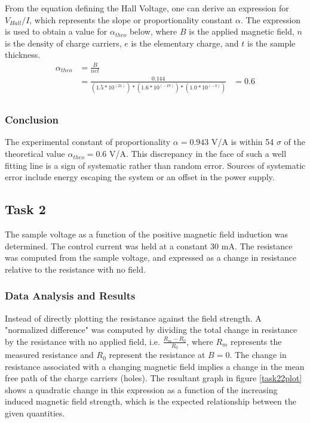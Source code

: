 \documentclass[a4paper]{article}
\begin{document}
\qq From the equation defining the Hall Voltage, one can derive an
expression for $V_{Hall}/I$, which represents the slope or
proportionality constant $\alpha$. The expression is used to obtain a
value for $\alpha_{theo}$ below, where $B$ is the applied magnetic
field, $n$ is the density of charge carriers, $e$ is the elementary
charge, and $t$ is the sample thickness.
\begin{align*}
\alpha_{theo} &= \frac{B}{net} \\
              &= \frac{0.144}{(1.5 * 10^(21))*(1.6 * 10^(-19))*(1.0 * 10^(-3))}
			  &= 0.6 \\
\end{align*}

\subsubsection{Conclusion}
The experimental constant of proportionality $\alpha = 0.943 $ V/A is
within 54 $\sigma$ of the theoretical value $\alpha_{theo} =
0.6$ V/A. This discrepancy in the face of such a well fitting line is a sign of
systematic rather than random error. Sources of systematic error include energy
escaping the system or an offset in the power supply.

\subsection{Task 2}

\qq The sample voltage as a function of the positive magnetic field
induction was determined. The control current was held at a constant
30 mA. The resistance was computed from the sample voltage, and
expressed as a change in resistance relative to the resistance with no
field.

\subsubsection{Data Analysis and Results}
\qq Instead of directly plotting the resistance against the field
strength. A "normalized difference" was computed by dividing the total
change in resistance by the resistance with no applied field,
i.e. $\frac{R_m - R_0}{R_0}$, where $R_m$ represents the measured
resistance and $R_0$ represent the resistance at $B=0$. The change in
resistance associated with a changing magnetic field implies a change
in the mean free path of the charge carriers (holes). The resultant
graph in figure \ref{task22plot} shows a quadratic change in this
expression as a function of the increasing induced magnetic field
strength, which is the expected relationship between the given
quantities.
\end{document}
